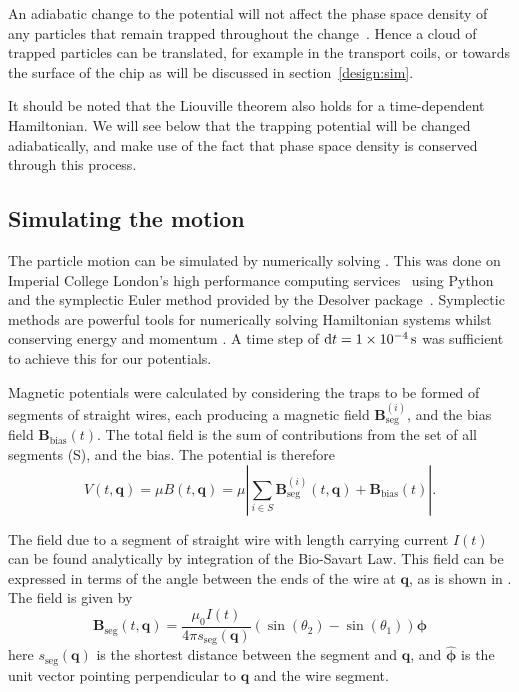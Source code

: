 An adiabatic change to the potential will not affect the phase space density of
any particles that remain trapped throughout the change~\cite{Hand1998,
Lichtenberg1969}. Hence a cloud of trapped particles can be translated, for
example in the transport coils, or towards the surface of the chip as will be
discussed in section~\ref{design:sim}.

It should be noted that the Liouville theorem also holds for a time-dependent
Hamiltonian. We will see below that the trapping potential will be changed
adiabatically, and make use of the fact that phase space density is conserved
through this process.

\subsection{Simulating the motion}
\label{design:motion:simmethods}


The particle motion can be simulated by numerically solving
. This was done on Imperial College London's high
performance computing services~\cite{ICRCS} using Python~\cite{python} and the
symplectic Euler method provided by the Desolver package~\cite{desolver}.
Symplectic methods are powerful tools for numerically solving Hamiltonian
systems whilst conserving energy and momentum \cite{Hairer2015,
doi:10.1119/1.2034523}. A time step of $\dd t = \SI{1E-4}{\second}$ was
sufficient to achieve this for our potentials.

Magnetic potentials were calculated by considering the traps to be formed of
segments of straight wires, each producing a magnetic field
$\mathbf{B}_\text{seg}^{(i)}$, and the bias field $\mathbf{B}_\text{bias}(t)$. The total
field is the sum of contributions from the set of all segments (S), and the
bias. The potential is therefore
%
\begin{equation} V(t, \mathbf{q}) = \mu B (t, \mathbf{q}) = \mu \left|
  \sum_{i\in S}
  \mathbf{B}_\text{seg}^{(i)}(t, \mathbf{q}) + \mathbf{B}_\text{bias}(t)\right|.
\end{equation}

The field due to a segment of straight wire with length carrying current $I(t)$
can be found analytically by integration of the Bio-Savart Law.
This field can be expressed in terms of the angle between the ends of the wire
at $\mathbf{q}$, as is shown in . The field
is given by~\cite{Griffiths2017}
%
\begin{equation}
  \mathbf{B}_\text{seg}(t, \mathbf{q}) = \frac{\mu_0 I(t)}{4\pi
  s_\text{seg}(\mathbf{q})} (\sin(\theta_2)  -
  \sin(\theta_1))\mathbf{\mathbf{\phi}}
\label{design:eq:segmentfield}
\end{equation}
here $s_\text{seg}(\mathbf{q})$ is the shortest distance between the segment
and $\mathbf{q}$, and $\hat{\mathbf{\phi}}$ is the unit vector pointing
perpendicular to $\mathbf{q}$ and the wire segment. 

